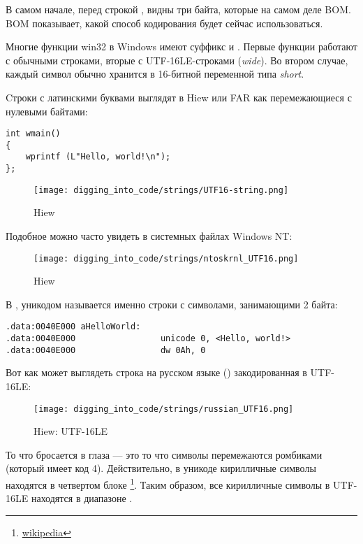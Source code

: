 В самом начале, перед строкой , видны три байта, которые на самом деле \ac{BOM}.
\ac{BOM} показывает, какой способ кодирования будет сейчас использоваться.


Многие функции win32 в Windows имеют суффикс  и .
Первые функции работают с обычными строками, вторые с UTF-16LE-строками (\emph{wide}).
Во втором случае, каждый символ обычно хранится в 16-битной переменной типа \emph{short}.

Cтроки с латинскими буквами выглядят в Hiew или FAR как перемежающиеся с нулевыми байтами:

\begin{lstlisting}[style=customc]
int wmain()
{
	wprintf (L"Hello, world!\n");
};
\end{lstlisting}

\begin{figure}[H]
\centering
\texttt{[image: digging\_into\_code/strings/UTF16-string.png]}
\caption{Hiew}
\end{figure}

Подобное можно часто увидеть в системных файлах \gls{Windows NT}:

\begin{figure}[H]
\centering
\texttt{[image: digging\_into\_code/strings/ntoskrnl\_UTF16.png]}
\caption{Hiew}
\end{figure}

В \IDA, уникодом называется именно строки с символами, занимающими 2 байта:

\begin{lstlisting}[style=customasmx86]
.data:0040E000 aHelloWorld:
.data:0040E000                 unicode 0, <Hello, world!>
.data:0040E000                 dw 0Ah, 0
\end{lstlisting}

Вот как может выглядеть строка на русском языке () закодированная в UTF-16LE:

\begin{figure}[H]
\centering
\texttt{[image: digging\_into\_code/strings/russian\_UTF16.png]}
\caption{Hiew: UTF-16LE}
\end{figure}

То что бросается в глаза --- это то что символы перемежаются ромбиками (который имеет код 4).
Действительно, в уникоде кирилличные символы находятся в четвертом блоке
\footnote{\href{http://go.yurichev.com/17003}{wikipedia}}.
Таким образом, все кирилличные символы в UTF-16LE находятся в диапазоне .

